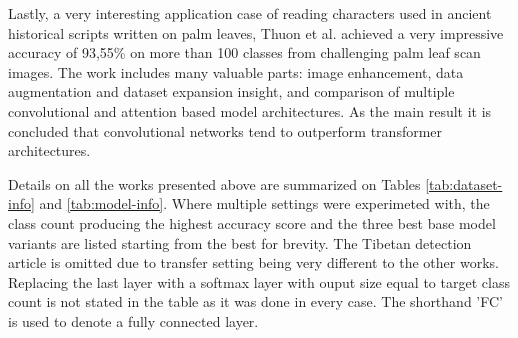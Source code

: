 \documentclass{article}
\begin{document}







Lastly, a very interesting application case of reading characters used in ancient historical scripts written 
on palm leaves, Thuon et al. \cite{9thuonPalm} achieved a very impressive accuracy of 93,55\% on more than 100 
classes from challenging palm leaf scan images. The work includes many valuable parts: image enhancement,
data augmentation and dataset expansion insight, and comparison of multiple convolutional and attention based model 
architectures. As the main result it is concluded that convolutional networks tend to outperform transformer architectures.

Details on all the works presented above are summarized on Tables \ref{tab:dataset-info} and \ref{tab:model-info}. Where multiple settings 
were experimeted with, the class count producing the highest accuracy score and the three best 
base model variants are listed starting from the best for brevity. The Tibetan detection article \cite{4zhaoTibetan}
is omitted due to transfer setting being very different to the other works. Replacing the last layer with a 
softmax layer with ouput size equal to target class count is not 
stated in the table as it was done in every case. The shorthand 'FC' is used to denote a fully connected layer.
\end{document}
